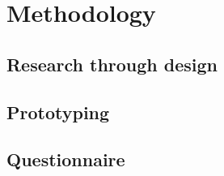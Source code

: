 \chapter{Methodology} %

\label{Chapter4} %


\section{Research through design}

\section{Prototyping}

\section{Questionnaire}

